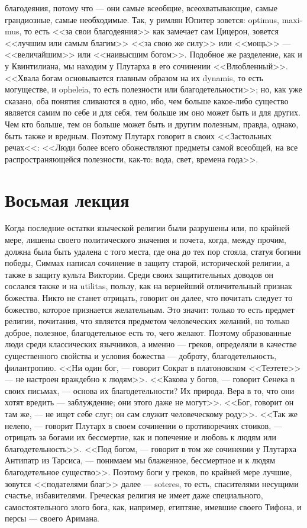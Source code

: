 \documentclass[12pt]{article}
\begin{document}
благодеяния, потому что --- они самые всеобщие, всеохватывающие, самые грандиозные, самые необходимые. Так, у римлян Юпитер зовется: optimus, maxi-mus, то есть <<за свои благодеяния>>  как замечает сам Цицерон, зовется <<лучшим или самым благим>>  <<за свою же силу>> или <<мощь>> --- <<величайшим>> или <<наивысшим богом>>. Подобное же разделение, как и у Квинтилиана, мы находим у Плутарха в его сочинении <<Влюбленный>>. <<Хвала богам основывается главным образом на их dynamis, то есть могуществе, и opheleia, то есть полезности или благодетельности>>; но, как уже сказано, оба понятия сливаются в одно, ибо, чем больше какое-либо существо является самим по себе и для себя, тем больше им оно может быть и для других. Чем кто больше, тем он больше может быть и другим полезным, правда, однако, быть также и вредным. Поэтому Плутарх говорит в своих <<Застольных речах<<: <<Люди более всего обожествляют предметы самой всеобщей, на все распространяющейся полезности, как-то: вода, свет, времена года>>. 

\section*{Восьмая лекция}

Когда последние остатки языческой религии были разрушены или, по крайней мере, лишены своего политического значения и почета, когда, между прочим, должна была быть удалена с того места, где она до тех пор стояла, статуя богини победы, Симмах написал сочинение в защиту старой, исторической религии, а также в защиту культа Виктории. Среди своих защитительных доводов он сослался также и на utilitas, пользу, как на вернейший отличительный признак божества. Никто не станет отрицать, говорит он далее, что почитать следует то божество, которое признается желательным. Это значит: только то есть предмет религии, почитания, что является предметом человеческих желаний, но только доброе, полезное, благодетельное есть то, чего желают. Поэтому образованные люди среди классических язычников, а именно --- греков, определяли в качестве существенного свойства и условия божества --- доброту, благодетельность, филантропию. <<Ни один бог, --- говорит Сократ в платоновском <<Теэтете>>  --- не настроен враждебно к людям>>. <<Какова у богов, --- говорит Сенека в своих письмах, --- основа их благодетельности? Их природа. Вера в то, что они хотят вредить --- заблуждение; они этого даже не могут>>. <<Бог, говорит он там же, --- не ищет себе слуг; он сам служит человеческому роду>>. <<Так же нелепо, --- говорит Плутарх в своем сочинении о противоречиях стоиков, --- отрицать за богами их бессмертие, как и попечение и любовь к людям или благодетельность>>. <<Под богом, --- говорит в том же сочинении у Плутарха Антипатр из Тарсиса, --- понимаем мы блаженное, бессмертное и к людям благодетельное существо>>. Поэтому боги у греков, по крайней мере лучшие, зовутся <<подателями благ>>  далее --- soteres, то есть, спасителями несущими счастье, избавителями. Греческая религия не имеет даже специального, самостоятельного злого бога, как, например, египтяне, имевшие своего Тифона, и персы --- своего Аримана. 
\end{document}
